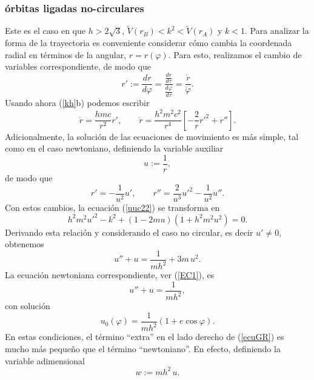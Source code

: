 \subsubsection{órbitas ligadas no-circulares}
Este es el caso en que $h>2\sqrt{3}$, $\tilde{V}(r_B)<k^2<\tilde{V}(r_A)$ y $k<1$. Para analizar la forma de la trayectoria es conveniente considerar cómo cambia la coordenada radial en términos de la angular, $r=r(\varphi)$. Para esto, realizamos el cambio de variables correspondiente, de modo que
\begin{equation}
r':=\frac{dr}{d\varphi}=\frac{\frac{dr}{d\tau}}{\frac{d\varphi}{d\tau}}=\frac{
\dot{r}}{\dot{\varphi}}.
\end{equation}
Usando ahora (\ref{kh}b) podemos escribir
\begin{equation}
\dot{r} =\frac{hmc}{r^2}r', \qquad \ddot{r}=\frac{h^2m^2c^2}{r^4}\left[-\frac{2}{r}r'^2+r''\right].
\end{equation}
Adicionalmente, la solución de las ecuaciones de movimiento es más simple, tal como en el caso newtoniano, definiendo la variable auxiliar
\begin{equation}
 u:=\frac{1}{r},
\end{equation}
de modo que
\begin{equation}
r' =-\frac{1}{u^2} u',  \qquad r''=\frac{2}{u^3}u'^2-\frac{1}{u^2}u''.
\end{equation}
Con estos cambios, la ecuación (\ref{uuc22})  se transforma en
\begin{equation}
h^2m^2u'^2-k^2+(1-2mu)(1+h^2m^2u^2)=0.
\end{equation}
Derivando esta relación y considerando el caso no circular, es decir $u'\neq 0$, obtenemos
\begin{equation}
u''+u=\frac{1}{mh^2}+3m\,u^2 \label{ecuGR}.
\end{equation}
La ecuación newtoniana correspondiente, ver (\ref{EC1}),  es
\begin{equation}
 u''+u=\frac{1}{mh^2},\label{ecrNew}
\end{equation}
con solución
\begin{equation}
 u_0(\varphi)=\frac{1}{mh^2}\left(1+e\cos\varphi\right).
\end{equation}
En estas condiciones, el término ``extra'' en el lado derecho de (\ref{ecuGR}) es mucho más pequeño que el término ``newtoniano''. En efecto, definiendo la variable adimensional
\begin{equation}
 w:=mh^2\,u.
\end{equation}
